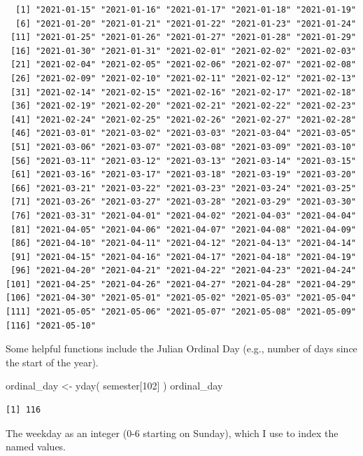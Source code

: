 \documentclass[
  letterpaper,
]{book}
\newenvironment{Shaded}{\begin{snugshade}}{\end{snugshade}}
\newcommand{\DecValTok}[1]{\textcolor[rgb]{0.68,0.00,0.00}{#1}}
\newcommand{\FunctionTok}[1]{\textcolor[rgb]{0.28,0.35,0.67}{#1}}
\newcommand{\NormalTok}[1]{\textcolor[rgb]{0.00,0.23,0.31}{#1}}
\newcommand{\OtherTok}[1]{\textcolor[rgb]{0.00,0.23,0.31}{#1}}
\begin{document}
\begin{verbatim}
  [1] "2021-01-15" "2021-01-16" "2021-01-17" "2021-01-18" "2021-01-19"
  [6] "2021-01-20" "2021-01-21" "2021-01-22" "2021-01-23" "2021-01-24"
 [11] "2021-01-25" "2021-01-26" "2021-01-27" "2021-01-28" "2021-01-29"
 [16] "2021-01-30" "2021-01-31" "2021-02-01" "2021-02-02" "2021-02-03"
 [21] "2021-02-04" "2021-02-05" "2021-02-06" "2021-02-07" "2021-02-08"
 [26] "2021-02-09" "2021-02-10" "2021-02-11" "2021-02-12" "2021-02-13"
 [31] "2021-02-14" "2021-02-15" "2021-02-16" "2021-02-17" "2021-02-18"
 [36] "2021-02-19" "2021-02-20" "2021-02-21" "2021-02-22" "2021-02-23"
 [41] "2021-02-24" "2021-02-25" "2021-02-26" "2021-02-27" "2021-02-28"
 [46] "2021-03-01" "2021-03-02" "2021-03-03" "2021-03-04" "2021-03-05"
 [51] "2021-03-06" "2021-03-07" "2021-03-08" "2021-03-09" "2021-03-10"
 [56] "2021-03-11" "2021-03-12" "2021-03-13" "2021-03-14" "2021-03-15"
 [61] "2021-03-16" "2021-03-17" "2021-03-18" "2021-03-19" "2021-03-20"
 [66] "2021-03-21" "2021-03-22" "2021-03-23" "2021-03-24" "2021-03-25"
 [71] "2021-03-26" "2021-03-27" "2021-03-28" "2021-03-29" "2021-03-30"
 [76] "2021-03-31" "2021-04-01" "2021-04-02" "2021-04-03" "2021-04-04"
 [81] "2021-04-05" "2021-04-06" "2021-04-07" "2021-04-08" "2021-04-09"
 [86] "2021-04-10" "2021-04-11" "2021-04-12" "2021-04-13" "2021-04-14"
 [91] "2021-04-15" "2021-04-16" "2021-04-17" "2021-04-18" "2021-04-19"
 [96] "2021-04-20" "2021-04-21" "2021-04-22" "2021-04-23" "2021-04-24"
[101] "2021-04-25" "2021-04-26" "2021-04-27" "2021-04-28" "2021-04-29"
[106] "2021-04-30" "2021-05-01" "2021-05-02" "2021-05-03" "2021-05-04"
[111] "2021-05-05" "2021-05-06" "2021-05-07" "2021-05-08" "2021-05-09"
[116] "2021-05-10"
\end{verbatim}

Some helpful functions include the Julian Ordinal Day (e.g., number of
days since the start of the year).

\begin{Shaded}
\begin{Highlighting}[]
\NormalTok{ordinal\_day }\OtherTok{\textless{}{-}} \FunctionTok{yday}\NormalTok{( semester[}\DecValTok{102}\NormalTok{] )}
\NormalTok{ordinal\_day}
\end{Highlighting}
\end{Shaded}

\begin{verbatim}
[1] 116
\end{verbatim}

The weekday as an integer (0-6 starting on Sunday), which I use to index
the named values.
\end{document}
